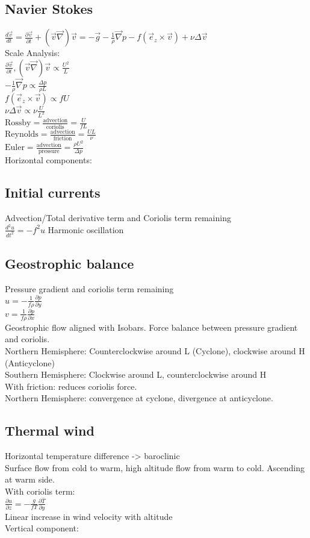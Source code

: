 \subsection*{Navier Stokes}
$\frac{d\vec{v}}{dt}=\frac{\partial\vec{v}}{\partial t}+(\vec{v}\vec{\nabla})\vec{v}=-\vec{g}-\frac{1}{\rho}\vec{\nabla}p-f(\vec{e}_z\times\vec{v})+\nu\Delta\vec{v}$\\
Scale Analysis:\\
$\frac{\partial\vec{v}}{\partial t},(\vec{v}\vec{\nabla})\vec{v}\propto \frac{U^2}{L}$\\
$-\frac{1}{\rho}\vec{\nabla}p\propto \frac{\Delta p}{\rho L}$\\
$f(\vec{e}_z\times\vec{v})\propto fU$\\
$\nu\Delta\vec{v}\propto \nu\frac{U}{L^2}$\\
$\text{Rossby} = \frac{\text{advection}}{\text{coriolis}}=\frac{U}{fL}$\\
$\text{Reynolds}=\frac{\text{advection}}{\text{friction}}=\frac{UL}{\nu}$\\
$\text{Euler}=\frac{\text{advection}}{\text{pressure}}=\frac{\rho U^2}{\Delta p}$\\
Horizontal components:
\subsection*{Initial currents}
Advection/Total derivative term and Coriolis term remaining\\
$\frac{d^2u}{dt^2}=-f^2u$ Harmonic oscillation
\subsection*{Geostrophic balance}
Pressure gradient and coriolis term remaining\\
$u=-\frac{1}{f\rho}\frac{\partial p}{\partial y}$\\
$v=\frac{1}{f\rho}\frac{\partial p}{\partial x}$\\
Geostrophic flow aligned with Isobars. Force balance between pressure gradient and coriolis.\\
Northern Hemisphere: Counterclockwise around L (Cyclone), clockwise around H (Anticyclone)\\
Southern Hemisphere: Clockwise around L, counterclockwise around H\\
With friction: reduces coriolis force.\\
Northern Hemisphere: convergence at cyclone, divergence at anticyclone.
\subsection*{Thermal wind}
Horizontal temperature difference -> baroclinic\\
Surface flow from cold to warm, high altitude flow from warm to cold. Ascending at warm side.\\
With coriolis term:\\
$\frac{\partial u}{\partial z}=-\frac{g}{fT}\frac{\partial \bar{T}}{\partial y}$\\
Linear increase in wind velocity with altitude\\
Vertical component:
